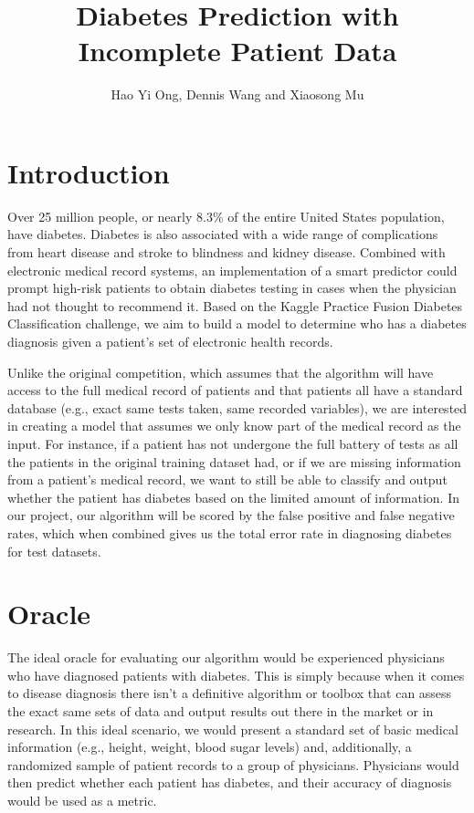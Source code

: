 \documentclass[11pt]{article}
\title{\vspace{-8ex}Diabetes Prediction with Incomplete Patient Data\vspace{-2ex}}
\author{Hao Yi Ong, Dennis Wang and Xiaosong Mu}
\date{}
\begin{document}
\maketitle

\section{Introduction}

Over 25 million people, or nearly 8.3\% of the entire United States population, have diabetes. Diabetes is also associated with a wide range of complications from heart disease and stroke to blindness and kidney disease. Combined with electronic medical record systems, an implementation of a smart predictor could prompt high-risk patients to obtain diabetes testing in cases when the physician had not thought to recommend it. Based on the Kaggle Practice Fusion Diabetes Classification challenge, we aim to build a model to determine who has a diabetes diagnosis given a patient's set of electronic health records. 

Unlike the original competition, which assumes that the algorithm will have access to the full medical record of patients and that patients all have a standard database (e.g., exact same tests taken, same recorded variables), we are interested in creating a model that assumes we only know part of the medical record as the input. For instance, if a patient has not undergone the full battery of tests as all the patients in the original training dataset had, or if we are missing information from a patient's medical record, we want to still be able to classify and output whether the patient has diabetes based on the limited amount of information. In our project, our algorithm will be scored by the false positive and false negative rates, which when combined gives us the total error rate in diagnosing diabetes for test datasets. 

\section{Oracle}

The ideal oracle for evaluating our algorithm would be experienced physicians who have diagnosed patients with diabetes. This is simply because when it comes to disease diagnosis there isn't a definitive algorithm or toolbox that can assess the exact same sets of data and output results out there in the market or in research. In this ideal scenario, we would present a standard set of basic medical information (e.g., height, weight, blood sugar levels) and, additionally, a randomized sample of patient records to a group of physicians. Physicians would then predict whether each patient has diabetes, and their accuracy of diagnosis would be used as a metric. 
\end{document}
